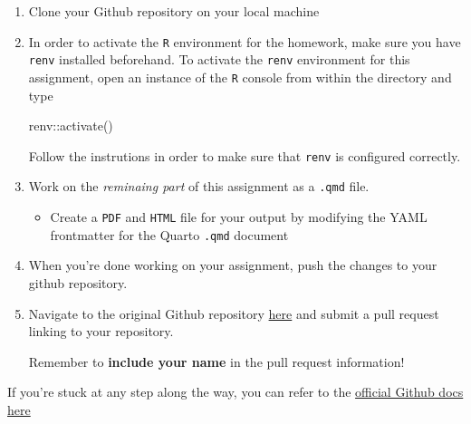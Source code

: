 \documentclass[
  letterpaper,
  DIV=11,
  numbers=noendperiod]{scrartcl}
\newenvironment{Shaded}{\begin{snugshade}}{\end{snugshade}}
\newcommand{\ExtensionTok}[1]{\textcolor[rgb]{0.00,0.23,0.31}{#1}}
\newcommand{\FunctionTok}[1]{\textcolor[rgb]{0.28,0.35,0.67}{#1}}
\newcommand{\NormalTok}[1]{\textcolor[rgb]{0.00,0.23,0.31}{#1}}
\newcommand{\OperatorTok}[1]{\textcolor[rgb]{0.37,0.37,0.37}{#1}}
\newcommand{\SpecialCharTok}[1]{\textcolor[rgb]{0.37,0.37,0.37}{#1}}
\newcommand{\StringTok}[1]{\textcolor[rgb]{0.13,0.47,0.30}{#1}}
\providecommand{\tightlist}{%
  \setlength{\itemsep}{0pt}\setlength{\parskip}{0pt}}\usepackage{longtable,booktabs,array}
\begin{document}
\begin{enumerate}
\def\labelenumi{\arabic{enumi}.}
\setcounter{enumi}{1}
\item
  Clone your Github repository on your local machine

\begin{Shaded}
\end{Shaded}
\item
  In order to activate the \texttt{R} environment for the homework, make
  sure you have \texttt{renv} installed beforehand. To activate the
  \texttt{renv} environment for this assignment, open an instance of the
  \texttt{R} console from within the directory and type

\begin{Shaded}
\begin{Highlighting}[]
\NormalTok{renv}\SpecialCharTok{::}\FunctionTok{activate}\NormalTok{()}
\end{Highlighting}
\end{Shaded}

  Follow the instrutions in order to make sure that \texttt{renv} is
  configured correctly.
\item
  Work on the \emph{reminaing part} of this assignment as a
  \texttt{.qmd} file.

  \begin{itemize}
  \tightlist
  \item
    Create a \texttt{PDF} and \texttt{HTML} file for your output by
    modifying the YAML frontmatter for the Quarto \texttt{.qmd} document
  \end{itemize}
\item
  When you're done working on your assignment, push the changes to your
  github repository.
\item
  Navigate to the original Github repository
  \href{https://github.com/STAT380/hw1.git}{here} and submit a pull
  request linking to your repository.

  Remember to \textbf{include your name} in the pull request
  information!
\end{enumerate}

If you're stuck at any step along the way, you can refer to the
\href{https://docs.github.com/en/pull-requests/collaborating-with-pull-requests/proposing-changes-to-your-work-with-pull-requests/creating-a-pull-request-from-a-fork}{official
Github docs here}
\end{document}
